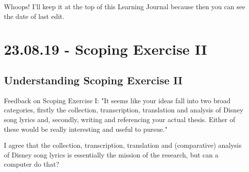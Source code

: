 \documentclass[12pt]{article}
\begin{document}
Whoops! I'll keep it at the top of this Learning Journal because then you can see the date of last edit.

\section{23.08.19 - Scoping Exercise II}
\subsection{Understanding Scoping Exercise II}
Feedback on Scoping Exercise I: "It seems like your ideas fall into two broad categories, firstly the collection, transcription, translation and analysis of Disney song lyrics and, secondly, writing and referencing your actual thesis. Either of these would be really interesting and useful to pursue."

I agree that the collection, transcription, translation and (comparative) analysis of Disney song lyrics is essentially the mission of the research, but can a computer do that?
 
\end{document}
